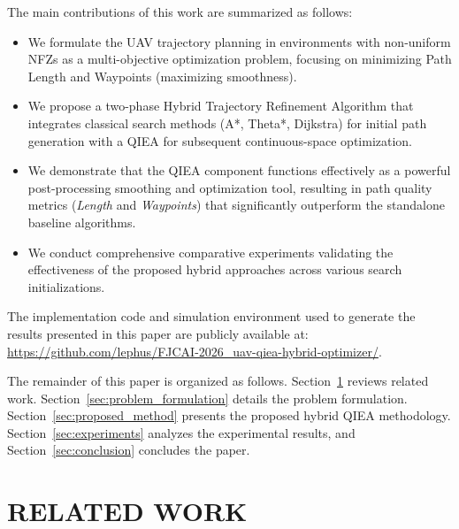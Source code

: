 The main contributions of this work are summarized as follows:
\begin{itemize}
    \item We formulate the UAV trajectory planning in environments with non-uniform NFZs as a multi-objective optimization problem, focusing on minimizing Path Length and Waypoints (maximizing smoothness).
    \item We propose a two-phase Hybrid Trajectory Refinement Algorithm that integrates classical search methods (A*, Theta*, Dijkstra) for initial path generation with a QIEA for subsequent continuous-space optimization.
    \item We demonstrate that the QIEA component functions effectively as a powerful post-processing smoothing and optimization tool, resulting in path quality metrics (\textit{Length} and \textit{Waypoints}) that significantly outperform the standalone baseline algorithms.
    \item We conduct comprehensive comparative experiments validating the effectiveness of the proposed hybrid approaches across various search initializations.
\end{itemize}


The implementation code and simulation environment used to generate the results presented in this paper are publicly available at: \url{https://github.com/lephus/FJCAI-2026_uav-qiea-hybrid-optimizer/}.

The remainder of this paper is organized as follows. Section~\ref{sec:related_work} reviews related work. Section~\ref{sec:problem_formulation} details the problem formulation. Section~\ref{sec:proposed_method} presents the proposed hybrid QIEA methodology. Section~\ref{sec:experiments} analyzes the experimental results, and Section~\ref{sec:conclusion} concludes the paper.

\section{RELATED WORK}
\label{sec:related_work}


